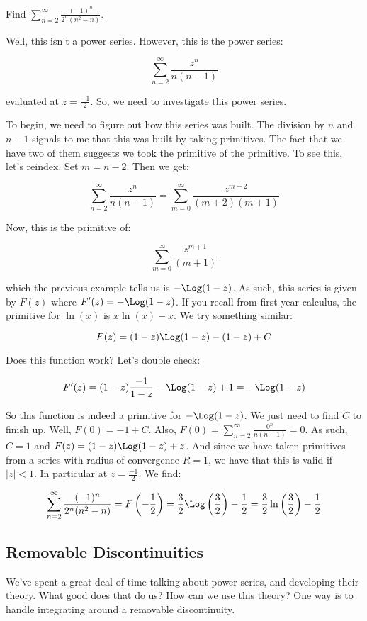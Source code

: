 \begin{ex}{}{} Find $\sum_{n=2}^\infty \frac{(-1)^n}{2^n(n^2 - n)}$. 

Well, this isn't a power series. However, this is the power series:

$$\sum_{n = 2}^\infty \frac{z^n}{n(n-1)}$$

\noin evaluated at $z = \frac{-1}{2}$. So, we need to investigate this power series.

To begin, we need to figure out how this series was built. The division by $n$ and $n-1$ signals to me that this was built by taking primitives. The fact that we have two of them suggests we took the primitive of the primitive. To see this, let's reindex. Set $m = n - 2$. Then we get:

$$\sum_{n = 2}^\infty \frac{z^n}{n(n-1)} = \sum_{m = 0}^\infty \frac{z^{m+2}}{(m+2)(m+1)}$$

Now, this is the primitive of:

$$\sum_{m = 0}^\infty \frac{z^{m+1}}{(m+1)}$$

\noin which the previous example tells us is $-\Log(1-z)$. As such, this series is given by $F(z)$ where $F'(z) = -\Log(1-z)$. If you recall from first year calculus, the primitive for $\ln(x)$ is $x\ln(x) - x$. We try something similar:

$$F(z) = (1-z)\Log(1-z) - (1-z) + C$$

Does this function work? Let's double check:

$$F'(z) = (1-z)\frac{-1}{1-z} - \Log(1-z) + 1 = -\Log(1-z)$$

So this function is indeed a primitive for $-\Log(1-z)$. We just need to find $C$ to finish up. Well, $F(0) = -1 + C$. Also, $F(0) = \sum_{n = 2}^\infty \frac{0^n}{n(n-1)} = 0$. As such, $C = 1$ and $F(z) = (1-z)\Log(1-z)+ z$. And since we have taken primitives from a series with radius of convergence $R = 1$, we have that this is valid if $|z| < 1$. In particular at $z = \frac{-1}{2}$. We find:

$$\sum_{n=2}^\infty \frac{(-1)^n}{2^n(n^2 - n)} = F\left(-\frac{1}{2}\right) = \frac{3}{2}\Log\left(\frac{3}{2}\right) - \frac{1}{2} = \frac{3}{2}\ln\left(\frac{3}{2}\right) - \frac{1}{2}$$
\end{ex}


\subsection{Removable Discontinuities}

We've spent a great deal of time talking about power series, and developing their theory. What good does that do us? How can we use this theory? One way is to handle integrating around a removable discontinuity.

